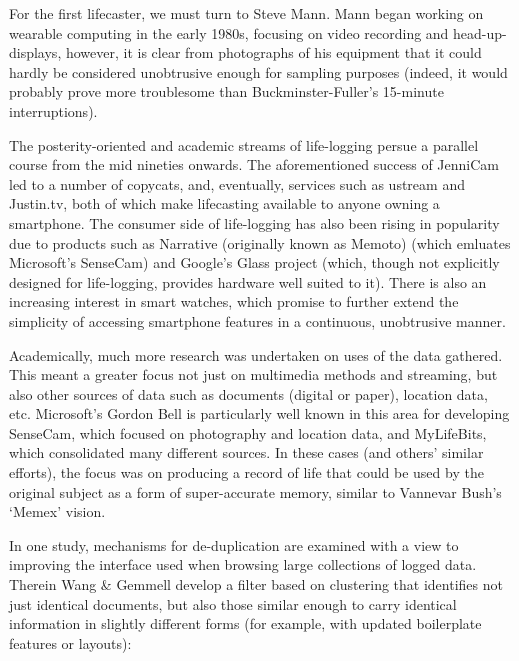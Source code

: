 For the first lifecaster, we must turn to Steve Mann.  Mann began working on wearable computing in the early 1980s\cite{mann1994wearable}, focusing on video recording and head-up-displays, however, it is clear from photographs of his equipment that it could hardly be considered unobtrusive enough for sampling purposes (indeed, it would probably prove more troublesome than Buckminster-Fuller's 15-minute interruptions).

The posterity-oriented and academic streams of life-logging persue a parallel course from the mid nineties onwards.  The aforementioned success of JenniCam led to a number of copycats, and, eventually, services such as ustream\cite{ustream2014homepage} and Justin.tv\cite{justintv2014homepage}, both of which make lifecasting available to anyone owning a smartphone.  The consumer side of life-logging has also been rising in popularity due to products such as Narrative\cite{narrative2014lifelog} (originally known as Memoto) (which emluates Microsoft's SenseCam\cite{hodges2006sensecam}) and Google's Glass project (which, though not explicitly designed for life-logging, provides hardware well suited to it).  There is also an increasing interest in smart watches, which promise to further extend the simplicity of accessing smartphone features in a continuous, unobtrusive manner.

Academically, much more research was undertaken on uses of the data gathered.  This meant a greater focus not just on multimedia methods and streaming, but also other sources of data such as documents (digital or paper), location data, etc.  Microsoft's Gordon Bell is particularly well known in this area for developing SenseCam\cite{hodges2006sensecam}, which focused on photography and location data, and MyLifeBits\cite{gemmell2002mylifebits,gemmell2006mylifebits}, which consolidated many different sources.  In these cases (and others' similar efforts\cite{huynh2002haystack,dumais2003stuff,dittrich2006imemex}), the focus was on producing a record of life that could be used by the original subject as a form of super-accurate memory, similar to Vannevar Bush's `Memex' vision\cite{bush1945we}.

In one study, mechanisms for de-duplication are examined with a view to improving the interface used when browsing large collections of logged data\cite{gemmell2006clean}.  Therein Wang \& Gemmell develop a filter based on clustering that identifies not just identical documents, but also those similar enough to carry identical information in slightly different forms (for example, with updated boilerplate features or layouts):

